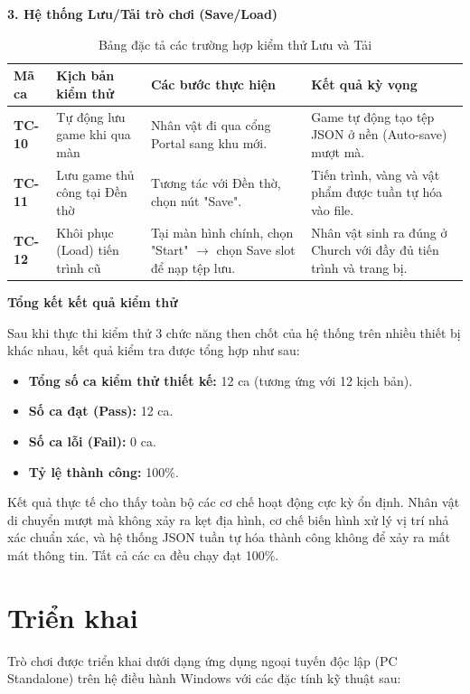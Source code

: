 \documentclass[../DoAn.tex]{subfiles}
\begin{document}
\vspace{10pt}
\textbf{3. Hệ thống Lưu/Tải trò chơi (Save/Load)}
\begin{table}[H]
\centering
\begin{tabular}{|p{1.2cm}|p{3.8cm}|p{3.8cm}|p{4.3cm}|}
\hline
\textbf{Mã ca} & \textbf{Kịch bản kiểm thử} & \textbf{Các bước thực hiện} & \textbf{Kết quả kỳ vọng} \\ \hline
\textbf{TC-10} & Tự động lưu game khi qua màn & Nhân vật đi qua cổng Portal sang khu mới. & Game tự động tạo tệp JSON ở nền (Auto-save) mượt mà. \\ \hline
\textbf{TC-11} & Lưu game thủ công tại Đền thờ & Tương tác với Đền thờ, chọn nút "Save". & Tiến trình, vàng và vật phẩm được tuần tự hóa vào file. \\ \hline
\textbf{TC-12} & Khôi phục (Load) tiến trình cũ & Tại màn hình chính, chọn "Start" $\rightarrow$ chọn Save slot để nạp tệp lưu. & Nhân vật sinh ra đúng ở Church với đầy đủ tiến trình và trang bị. \\ \hline
\end{tabular}
\caption{Bảng đặc tả các trường hợp kiểm thử Lưu và Tải}
\label{table:test_saveload}
\end{table}

\vspace{10pt}
\textbf{Tổng kết kết quả kiểm thử}

Sau khi thực thi kiểm thử 3 chức năng then chốt của hệ thống trên nhiều thiết bị khác nhau, kết quả kiểm tra được tổng hợp như sau:
\begin{itemize}
    \item \textbf{Tổng số ca kiểm thử thiết kế:} 12 ca (tương ứng với 12 kịch bản).
    \item \textbf{Số ca đạt (Pass):} 12 ca.
    \item \textbf{Số ca lỗi (Fail):} 0 ca.
    \item \textbf{Tỷ lệ thành công:} 100\%.
\end{itemize}
Kết quả thực tế cho thấy toàn bộ các cơ chế hoạt động cực kỳ ổn định. Nhân vật di chuyển mượt mà không xảy ra kẹt địa hình, cơ chế biến hình xử lý vị trí nhả xác chuẩn xác, và hệ thống JSON tuần tự hóa thành công không để xảy ra mất mát thông tin. Tất cả các ca đều chạy đạt 100\%.


\section{Triển khai}
\label{section:5.7}
Trò chơi được triển khai dưới dạng ứng dụng ngoại tuyến độc lập (PC Standalone) trên hệ điều hành Windows với các đặc tính kỹ thuật sau:
\end{document}

